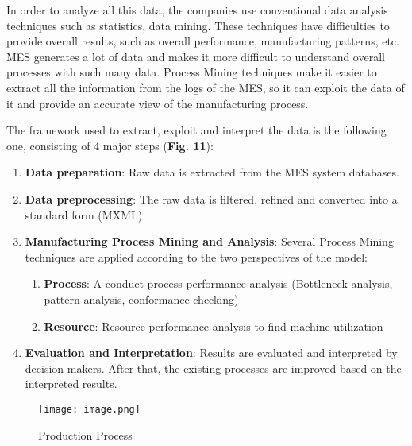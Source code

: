\documentclass[conference]{IEEEtran}
\begin{document}
In order to analyze all this data, the companies use conventional data analysis techniques such as statistics, data mining. These techniques have difficulties to provide overall results, such as overall performance, manufacturing patterns, etc. MES generates a lot of data and makes it more difficult to understand overall processes with such many data. Process Mining techniques make it easier to extract all the information from the logs of the MES, so it can exploit the data of it and provide an accurate view of the manufacturing process. 

The framework used to extract, exploit and interpret the data is the following one, consisting of 4 major steps (\textbf{Fig. 11}):
\begin{enumerate}
    \item \textbf{Data preparation}: Raw data is extracted from the MES system databases.
    \item \textbf{Data preprocessing}: The raw data is filtered, refined and converted into a standard form (MXML)
    \item \textbf{Manufacturing Process Mining and Analysis}: Several Process Mining techniques are applied according to the two perspectives of the model:
    \begin{enumerate}
        \item \textbf{Process}: A conduct process performance analysis (Bottleneck analysis, pattern analysis, conformance checking)
        \item \textbf{Resource}: Resource performance analysis to find machine utilization
    \end{enumerate}
    \item \textbf{Evaluation and Interpretation}: Results are evaluated and interpreted by decision makers. After that, the existing processes are improved based on the interpreted results.
\end{enumerate}

\begin{figure}[htp]
    \centering
    \texttt{[image: image.png]}
    \caption{Production Process}
    \label{fig:modelDrawn}
\end{figure}
\end{document}
